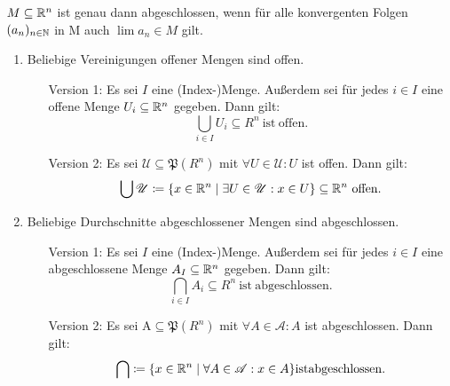 \begin{lemma}
    \(M\subseteq \mathbb{R}^n\) ist genau dann abgeschlossen, wenn für alle konvergenten Folgen \((a_n)_{n\in \mathbb{N}}\) in M auch \(\lim a_n \in M\) gilt.
\end{lemma}
\begin{satz}
    \begin{enumerate}
        \item Beliebige Vereinigungen offener Mengen sind offen.
        \begin{itemize}
            \item[Version 1:] Es sei $I$ eine (Index-)Menge. Außerdem sei für jedes $i\in I$ eine offene Menge $U_i\subseteq \mathbb{R}^n$ gegeben. Dann gilt:
            \[
                \bigcup_{i\in I} U_i \subseteq R^n \mathrm{\ ist\ offen.}
            \]
            \item[Version 2:] Es sei $\mathscr{U}\subseteq\mathfrak{P}(R^n)$ mit \(\forall U\in \mathscr{U}: U\) ist offen. Dann gilt:
            \[
                \bigcup \mathscr{U} \coloneqq \{x\in\mathbb{R}^n \mid \exists U\in\mathscr{U}: x\in U\}\subseteq \mathbb{R}^n \mathrm{\ offen.}
            \]
        \end{itemize}
        \item Beliebige Durchschnitte abgeschlossener Mengen sind abgeschlossen.
        \begin{itemize}
            \item[Version 1:] Es sei $I$ eine (Index-)Menge. Außerdem sei für jedes $i\in I$ eine abgeschlossene Menge $A_I\subseteq \mathbb{R}^n$ gegeben. Dann gilt:
            \[
                \bigcap_{i\in I} A_i \subseteq R^n \mathrm{\ ist\ abgeschlossen.}
            \]
            \item[Version 2:] Es sei $\mathrm{A}\subseteq\mathfrak{P}(R^n)$ mit \(\forall A\in \mathscr{A}: A\) ist abgeschlossen. Dann gilt:
            \[
                \bigcap \coloneqq \{x\in \mathbb{R}^n \mid \forall A\in\mathscr{A}: x\in A\} \mathrm{ist abgeschlossen.}
            \]
        \end{itemize}

    \end{enumerate}
\end{satz}
